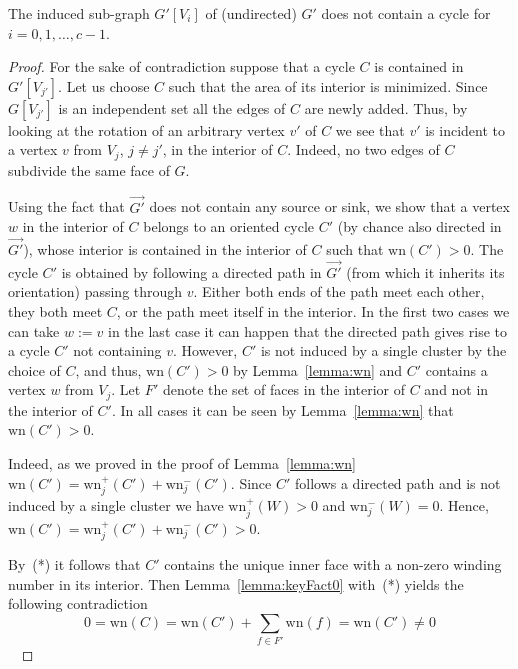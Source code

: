 \documentclass{llncs}
\def\qed{ \ \vrule width.2cm height.2cm depth0cm\smallskip}
\def\wn{\mathrm{wn}}
\begin{document}
    \begin{lemma}
\label{lemma:keyFact1}
The induced sub-graph $G'[V_i]$ of (undirected) $G'$ does not contain a cycle for $i=0,1,\ldots, c-1$.
\end{lemma}
\begin{proof}
For the sake of contradiction suppose that a cycle $C$ is contained in $G'[V_{j'}]$.
Let us choose $C$ such that the area of its interior is minimized.
Since $G[V_{j'}]$ is an independent set all the edges of $C$ are newly added.
Thus, by looking at the rotation of an arbitrary vertex $v'$ of $C$ we see that $v'$ is incident to a vertex 
 $v$ from  $V_j$, $j\not=j'$,  in the interior of $C$. Indeed, no two edges of $C$ subdivide the same face of $G$.
 
 



 
Using the fact that $\overrightarrow{G'}$ does not contain any source or sink, we show that 
a vertex $w$ in the interior of $C$ belongs to an oriented cycle $C'$ (by chance also directed in $\overrightarrow{G'}$), whose interior is contained in the interior of $C$   
such that $\wn(C')>0$.
The cycle $C'$ is obtained by following a directed path in $\overrightarrow{G'}$ (from which it inherits its orientation)
 passing through  $v$.
Either both ends of the path meet each other, they both meet $C$, or the path meet itself in the interior. 
In the first two cases we can take $w:=v$ in the last case it can happen that the directed path gives rise to a cycle $C'$ not containing $v$. However, $C'$ is not induced by a single cluster by the choice of $C$, and thus, $\wn(C')>0$ by Lemma~\ref{lemma:wn} and $C'$ contains a vertex $w$ from $V_j$.
Let $F'$ denote the set of faces
in the interior of $C$ and not in the interior of $C'$. 
In all cases it can be seen   by Lemma~\ref{lemma:wn} that $\wn(C')>0$.

Indeed, as we proved in  the proof of Lemma~\ref{lemma:wn} 
$\wn(C') = \wn_j^+(C') + \wn_j^-(C')$.
Since $C'$ follows a directed path and is not induced by a single cluster we have $\wn_j^+(W)>0$ and $\wn_j^-(W)=0$.
Hence, $\wn(C') = \wn_j^+(C') + \wn_j^-(C')>0$. 



 By~(*) it follows that $C'$ contains the unique
inner face with a non-zero winding number in its interior.
Then Lemma~\ref{lemma:keyFact0} with~(*) yields the following  contradiction
$$0=\wn(C)=\wn(C')+\sum_{f\in F'} \wn(f)=\wn(C')\not=0$$
\qed\end{proof}
\end{document}
